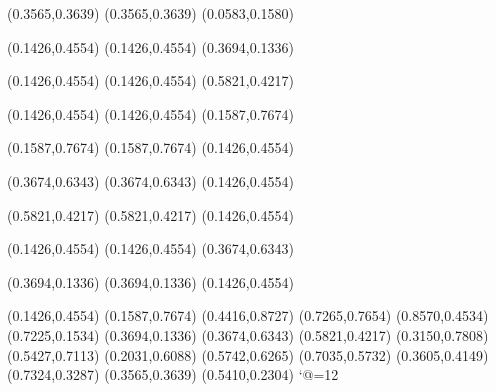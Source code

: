 \PST@Border(0.3565,0.3639)
(0.3565,0.3639)
(0.0583,0.1580)

\PST@Dashed(0.1426,0.4554)
(0.1426,0.4554)
(0.3694,0.1336)

\PST@Dashed(0.1426,0.4554)
(0.1426,0.4554)
(0.5821,0.4217)

\PST@Dashed(0.1426,0.4554)
(0.1426,0.4554)
(0.1587,0.7674)

\PST@Dashed(0.1587,0.7674)
(0.1587,0.7674)
(0.1426,0.4554)

\PST@Dashed(0.3674,0.6343)
(0.3674,0.6343)
(0.1426,0.4554)

\PST@Dashed(0.5821,0.4217)
(0.5821,0.4217)
(0.1426,0.4554)

\PST@Dashed(0.1426,0.4554)
(0.1426,0.4554)
(0.3674,0.6343)

\PST@Dashed(0.3694,0.1336)
(0.3694,0.1336)
(0.1426,0.4554)

\PST@Fillcircle(0.1426,0.4554)
\PST@Fillcircle(0.1587,0.7674)
\PST@Fillcircle(0.4416,0.8727)
\PST@Fillcircle(0.7265,0.7654)
\PST@Fillcircle(0.8570,0.4534)
\PST@Fillcircle(0.7225,0.1534)
\PST@Fillcircle(0.3694,0.1336)
\PST@Fillcircle(0.3674,0.6343)
\PST@Fillcircle(0.5821,0.4217)
\PST@Circle(0.3150,0.7808)
\PST@Circle(0.5427,0.7113)
\PST@Circle(0.2031,0.6088)
\PST@Circle(0.5742,0.6265)
\PST@Circle(0.7035,0.5732)
\PST@Circle(0.3605,0.4149)
\PST@Circle(0.7324,0.3287)
\PST@Circle(0.3565,0.3639)
\PST@Circle(0.5410,0.2304)
\catcode`@=12
\fi
\endpspicture
